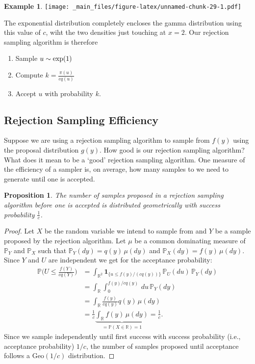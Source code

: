 \documentclass[
]{book}
\providecommand{\tightlist}{%
  \setlength{\itemsep}{0pt}\setlength{\parskip}{0pt}}
\newtheorem{proposition}{Proposition}[chapter]
\theoremstyle{definition}
\theoremstyle{definition}
\newtheorem{example}{Example}[chapter]
\theoremstyle{definition}
\theoremstyle{definition}
\theoremstyle{remark}
\begin{document}
\begin{example}
\texttt{[image: \_main\_files/figure-latex/unnamed-chunk-29-1.pdf]}

The exponential distribution completely encloses the gamma distribution using this value of \(c\), wiht the two densities just touching at \(x=2\). Our rejection sampling algorithm is therefore

\begin{enumerate}
\def\labelenumi{\arabic{enumi}.}
\tightlist
\item
  Sample \(u \sim \hbox{exp}(1)\)
\item
  Compute \(k = \frac{\pi(u)}{cq(u)}\)
\item
  Accept \(u\) with probability \(k\).
\end{enumerate}

\end{example}

\hypertarget{rejection-sampling-efficiency}{%
\subsection{Rejection Sampling Efficiency}\label{rejection-sampling-efficiency}}

Suppose we are using a rejection sampling algorithm to sample from \(f(y)\) using the proposal distribution \(g(y)\). How good is our rejection sampling algorithm? What does it mean to be a `good' rejection sampling algorithm. One measure of the efficiency of a sampler is, on average, how many samples to we need to generate until one is accepted.

\begin{proposition}
The number of samples proposed in a rejection sampling algorithm before one is accepted is distributed geometrically with success probability \(\frac{1}{c}\).
\end{proposition}

\begin{proof}
Let \(X\) be the random variable we intend to sample from and \(Y\) be a sample proposed by the rejection algorithm. Let \(\mu\) be a common dominating measure of \(\mathbb{P}_Y\) and \(\mathbb{P}_X\) such that \(\mathbb{P}_Y(dy) = q(y) \,\mu(dy)\) and \(\mathbb{P}_X(dy) = f(y)\, \mu(dy)\). Since \(Y\) and \(U\) are independent we get for the acceptance probability:
\begin{align*} 
\mathbb{P}\Big(U \leq \frac{f(Y)}{cq(Y)}\Big) &= \int_{\mathbb{R}^2} \mathbf{1}_{\{u \leq f(y)/(cq(y))\}} \, \mathbb{P}_U(du) \, \mathbb{P}_Y(dy)\\ 
&= \int_{\mathbb{R}} \int_0^{f(y)/cq(y)} \, du \, \mathbb{P}_Y(dy)\\ 
&= \int_{\mathbb{R}} \frac{f(y)}{cq(y)} q(y) \, \mu(dy)\\ 
&= \frac{1}{c} \underbrace{\int_{\mathbb{R}} f(y) \, \mu(dy)}_{= \mathbb{P}(X \in \mathbb{R}) = 1} = \frac{1}{c}.
\end{align*}
Since we sample independently until first success with success probability (i.e., acceptance probability) \(1/c\), the number of samples proposed until acceptance follows a \(\mathrm{Geo}(1/c)\) distribution.
\end{proof}
\end{document}
